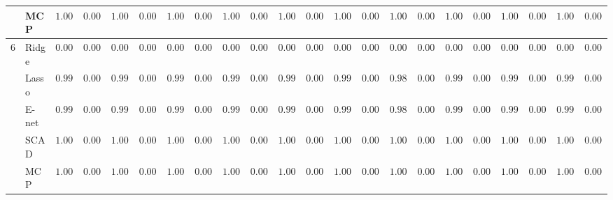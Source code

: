 \begin{tabular}{p{0.2cm}p{1cm}|p{0.6cm}p{0.6cm}|p{0.6cm}p{0.6cm}p{0.6cm}p{0.6cm}p{0.6cm}p{0.6cm}|p{0.6cm}p{0.6cm}p{0.6cm}p{0.6cm}p{0.6cm}p{0.6cm}|p{0.6cm}p{0.6cm}p{0.6cm}p{0.6cm}p{0.6cm}p{0.6cm}}
 & MCP  & $1.0000$ & $0.0000$ & $1.0000$ & $0.0000$ & $1.0000$ & $0.0000$ & $1.0000$ & $0.0000$ & $1.0000$ & $0.0001$ & $1.0000$ & $0.0000$ & $1.0000$ & $0.0000$ & $1.0000$ & $0.0000$ & $1.0000$ & $0.0000$ & $1.0000$ & $0.0000$ \\\hline
6 & Ridge  & $0.0000$ & $0.0000$ & $0.0000$ & $0.0000$ & $0.0000$ & $0.0000$ & $0.0000$ & $0.0000$ & $0.0000$ & $0.0000$ & $0.0000$ & $0.0000$ & $0.0000$ & $0.0000$ & $0.0000$ & $0.0000$ & $0.0000$ & $0.0000$ & $0.0000$ & $0.0000$ \\
 & Lasso  & $0.9999$ & $0.0003$ & $0.9991$ & $0.0013$ & $0.9977$ & $0.0018$ & $0.9974$ & $0.0020$ & $0.9997$ & $0.0009$ & $0.9995$ & $0.0011$ & $0.9890$ & $0.0048$ & $0.9998$ & $0.0006$ & $0.9991$ & $0.0012$ & $0.9949$ & $0.0024$ \\
 & E-net  & $0.9998$ & $0.0004$ & $0.9985$ & $0.0017$ & $0.9963$ & $0.0022$ & $0.9962$ & $0.0024$ & $0.9996$ & $0.0010$ & $0.9991$ & $0.0016$ & $0.9867$ & $0.0052$ & $0.9996$ & $0.0009$ & $0.9985$ & $0.0016$ & $0.9938$ & $0.0027$ \\
 & SCAD  & $1.0000$ & $0.0000$ & $1.0000$ & $0.0000$ & $1.0000$ & $0.0000$ & $1.0000$ & $0.0000$ & $1.0000$ & $0.0001$ & $1.0000$ & $0.0000$ & $1.0000$ & $0.0000$ & $1.0000$ & $0.0000$ & $1.0000$ & $0.0000$ & $1.0000$ & $0.0000$ \\
 & MCP  & $1.0000$ & $0.0000$ & $1.0000$ & $0.0000$ & $1.0000$ & $0.0000$ & $1.0000$ & $0.0000$ & $1.0000$ & $0.0001$ & $1.0000$ & $0.0000$ & $1.0000$ & $0.0000$ & $1.0000$ & $0.0000$ & $1.0000$ & $0.0000$ & $1.0000$ & $0.0000$ \\
\hline 
\end{tabular}

